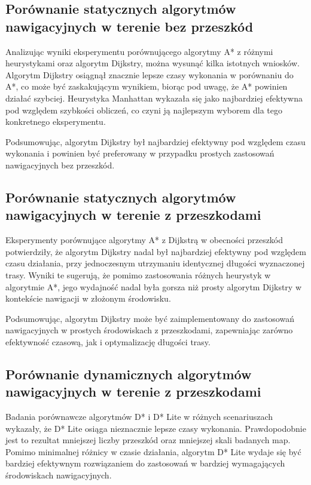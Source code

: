 \documentclass[12pt,twoside]{article}
\begin{document}
\subsection{Porównanie statycznych algorytmów nawigacyjnych w terenie bez przeszkód}
Analizując wyniki eksperymentu porównującego algorytmy A* z różnymi heurystykami oraz algorytm Dijkstry, można wysunąć kilka istotnych wniosków. Algorytm Dijkstry osiągnął znacznie lepsze czasy wykonania w porównaniu do A*, co może być zaskakującym wynikiem, biorąc pod uwagę, że A* powinien działać szybciej. Heurystyka Manhattan wykazała się jako najbardziej efektywna pod względem szybkości obliczeń, co czyni ją najlepszym wyborem dla tego konkretnego eksperymentu.

Podsumowując, algorytm Dijkstry był najbardziej efektywny pod względem czasu wykonania i powinien być preferowany w przypadku prostych zastosowań nawigacyjnych bez przeszkód.

\subsection{Porównanie statycznych algorytmów nawigacyjnych w terenie z przeszkodami}
Eksperymenty porównujące algorytmy A* z Dijkstrą w obecności przeszkód potwierdziły, że algorytm Dijkstry nadal był najbardziej efektywny pod względem czasu działania, przy jednoczesnym utrzymaniu identycznej długości wyznaczonej trasy. Wyniki te sugerują, że pomimo zastosowania różnych heurystyk w algorytmie A*, jego wydajność nadal była gorsza niż prosty algorytm Dijkstry w kontekście nawigacji w złożonym środowisku.

Podsumowując, algorytm Dijkstry może być zaimplementowany do zastosowań nawigacyjnych w prostych środowiskach z przeszkodami, zapewniając zarówno efektywność czasową, jak i optymalizację długości trasy.

\subsection{Porównanie dynamicznych algorytmów nawigacyjnych w terenie z przeszkodami}
Badania porównawcze algorytmów D* i D* Lite w różnych scenariuszach wykazały, że D* Lite osiąga nieznacznie lepsze czasy wykonania. Prawdopodobnie jest to rezultat mniejszej liczby przeszkód oraz mniejszej skali badanych map. Pomimo minimalnej różnicy w czasie działania, algorytm D* Lite wydaje się być bardziej efektywnym rozwiązaniem do zastosowań w bardziej wymagających środowiskach nawigacyjnych.
\end{document}
